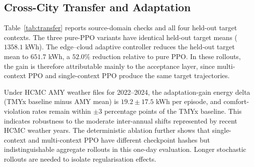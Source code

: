 \documentclass[runningheads,a4paper]{llncs}
\begin{document}
\subsection{Cross-City Transfer and Adaptation}
Table~\ref{tab:transfer} reports source-domain checks and all four held-out target contexts. The three pure-PPO variants have identical held-out target means ($1358.1$ kWh). The edge--cloud adaptive controller reduces the held-out target mean to $651.7$ kWh, a $52.0\%$ reduction relative to pure PPO. In these rollouts, the gain is therefore attributable mainly to the acceptance layer, since multi-context PPO and single-context PPO produce the same target trajectories.

\begin{table}[t]
\centering
\caption{Transfer energy (kWh). Can Tho is a source-domain check; Da Nang and Hanoi are held-out targets.}
\label{tab:transfer}
\scriptsize
{}
\end{table}

Under HCMC AMY weather files for 2022--2024, the adaptation-gain energy delta (TMYx baseline minus AMY mean) is $19.2\pm17.5$ kWh per episode, and comfort-violation rates remain within $\pm3$ percentage points of the TMYx baseline. This indicates robustness to the moderate inter-annual shifts represented by recent HCMC weather years. The deterministic ablation further shows that single-context and multi-context PPO have different checkpoint hashes but indistinguishable aggregate rollouts in this one-day evaluation. Longer stochastic rollouts are needed to isolate regularisation effects.
\end{document}
